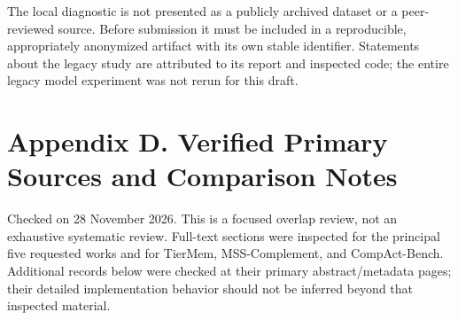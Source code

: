 \documentclass[
  11pt,
  a4paper,
]{article}
\begin{document}
The local diagnostic is not presented as a publicly archived dataset or
a peer-reviewed source. Before submission it must be included in a
reproducible, appropriately anonymized artifact with its own stable
identifier. Statements about the legacy study are attributed to its
report and inspected code; the entire legacy model experiment was not
rerun for this draft.

\section{Appendix D. Verified Primary Sources and Comparison
Notes}\label{appendix-d.-verified-primary-sources-and-comparison-notes}

Checked on 28 November 2026. This is a focused overlap review, not an
exhaustive systematic review. Full-text sections were inspected for the
principal five requested works and for TierMem, MSS-Complement, and
CompAct-Bench. Additional records below were checked at their primary
abstract/metadata pages; their detailed implementation behavior should
not be inferred beyond that inspected material.
\end{document}
